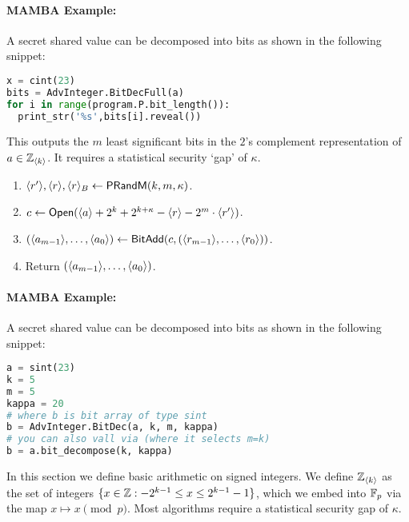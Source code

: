   \paragraph{MAMBA Example:} A secret shared value can be decomposed into bits as shown in the following snippet:
  \begin{lstlisting}[language={python}]
x = cint(23)
bits = AdvInteger.BitDecFull(a)
for i in range(program.P.bit_length()):
  print_str('%s',bits[i].reveal())
\end{lstlisting}


  This outputs the $m$ least significant bits in the $2$'s complement
  representation of $a \in {\mathbb{Z}}_{\langle k \rangle}$.
  It requires a statistical security `gap' of $\kappa$.
  \begin{enumerate}
    \item $\langle r' \rangle, \langle r \rangle, \langle r \rangle_B \leftarrow \mathsf{PRandM}(k,m,\kappa)$.
    \item $c \leftarrow {\mathsf{Open}}(\langle a \rangle+2^k+2^{k+\kappa}-\langle r \rangle-2^m \cdot \langle r' \rangle)$.
    \item $(\langle a_{m-1} \rangle,\ldots,\langle a_0 \rangle) \leftarrow
            \mathsf{BitAdd}(c,(\langle r_{m-1} \rangle,\ldots,\langle r_0 \rangle))$.
    \item Return $(\langle a_{m-1} \rangle,\ldots,\langle a_0 \rangle)$.
  \end{enumerate}
  \paragraph{MAMBA Example:} A secret shared value can be decomposed into bits as shown in the following snippet:
  \begin{lstlisting}[language={python}]
a = sint(23)
k = 5
m = 5
kappa = 20
# where b is bit array of type sint
b = AdvInteger.BitDec(a, k, m, kappa)
# you can also vall via (where it selects m=k)
b = a.bit_decompose(k, kappa)
\end{lstlisting}

  In this section we define basic arithmetic on signed integers.
  We define ${\mathbb{Z}}_{\langle k \rangle}$ as the set of integers $\{x \in {\mathbb{Z}}: -2^{k-1} \le x \le 2^{k-1}-1\}$,
  which we embed into ${\mathbb{F}}_p$ via the map $x \mapsto x \pmod{p}$.
  Most algorithms require a statistical security gap of $\kappa$.


